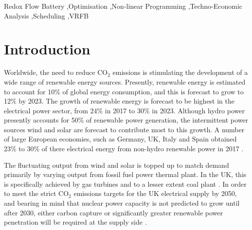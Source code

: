 \documentclass[preprint,3p,review,authoryear,10pt]{elsarticle}
\begin{document}
\begin{frontmatter}
\begin{abstract}
\end{abstract}

\begin{keyword}
Redox Flow Battery \sep Optimisation \sep Non-linear Programming \sep Techno-Economic Analysis \sep Scheduling \sep VRFB  


\end{keyword}

\end{frontmatter}


\section{Introduction}
\label{sec:Intro}
Worldwide, the need to reduce CO$_2$ emissions is stimulating the development of a wide range of renewable energy sources. Presently, renewable energy is estimated to account for 10\% of global energy consumption, and this is forecast to grow to 12\% by 2023. The growth of renewable energy is forecast to be highest in the electrical power sector, from 24\% in 2017 to 30\% in 2023. Although hydro power presently accounts for 50\% of renewable power generation, the  intermittent power sources wind and solar are forecast to contribute most to this growth\cite{IEA2018}. A number of large European economies, such as Germany, UK, Italy and Spain obtained 23\% to 30\% of there electrical energy from non-hydro renewable power in 2017 \cite{BP2018}.

The fluctuating output from wind and solar is topped up to match demand primarily by varying output from fossil fuel power thermal plant. In the UK, this is specifically achieved by gas turbines and to a lesser extent coal plant \cite{DraxElectricInsights}. In order to meet the strict CO$_2$ emissions targets for the UK electrical supply by 2050, and bearing in mind that nuclear power capacity is not predicted to grow until after 2030, either carbon capture or significantly greater renewable power penetration will be required at the supply side \cite{FES2018}.
\end{document}
